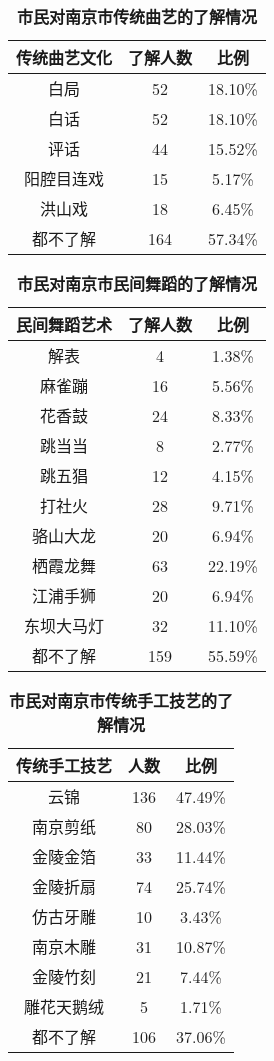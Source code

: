 \documentclass[12pt]{article}%
\begin{document}
\begin{table}[htbp]
  \centering
  \caption{\bf{市民对南京市传统曲艺的了解情况}}
    \begin{tabular}{ccc}
    \hline
    传统曲艺文化  & 了解人数  & 比例 \\
        \hline
    白局    & 52    & 18.10\% \\
    白话    & 52    & 18.10\% \\
    评话    & 44    & 15.52\% \\
    阳腔目连戏 & 15    & 5.17\% \\
    洪山戏   & 18    & 6.45\% \\
    都不了解  & 164   & 57.34\% \\
        \hline
    \end{tabular}%
\end{table}%

\begin{table}[htbp]
  \centering
  \caption{\bf{市民对南京市民间舞蹈的了解情况}}
    \begin{tabular}{ccc}
    \hline
    民间舞蹈艺术    & 了解人数  & 比例 \\
    \hline
    解表    & 4     & 1.38\% \\
    麻雀蹦   & 16    & 5.56\% \\
    花香鼓   & 24    & 8.33\% \\
    跳当当   & 8     & 2.77\% \\
    跳五猖   & 12    & 4.15\% \\
    打社火   & 28    & 9.71\% \\
    骆山大龙  & 20    & 6.94\% \\
    栖霞龙舞  & 63    & 22.19\% \\
    江浦手狮  & 20    & 6.94\% \\
    东坝大马灯 & 32    & 11.10\% \\
    都不了解  & 159   & 55.59\% \\
    \hline
    \end{tabular}%
\end{table}%

\begin{table}[htbp]
  \centering
  \caption{\bf{市民对南京市传统手工技艺的了解情况}}
    \begin{tabular}{ccc}
    \hline
    传统手工技艺    & 人数    & 比例 \\
    \hline
    云锦    & 136   & 47.49\% \\
    南京剪纸  & 80    & 28.03\% \\
    金陵金箔  & 33    & 11.44\% \\
    金陵折扇  & 74    & 25.74\% \\
    仿古牙雕  & 10    & 3.43\% \\
    南京木雕  & 31    & 10.87\% \\
    金陵竹刻  & 21    & 7.44\% \\
    雕花天鹅绒 & 5     & 1.71\% \\
    都不了解  & 106   & 37.06\% \\
    \hline
    \end{tabular}%
\end{table}%
\end{document}
